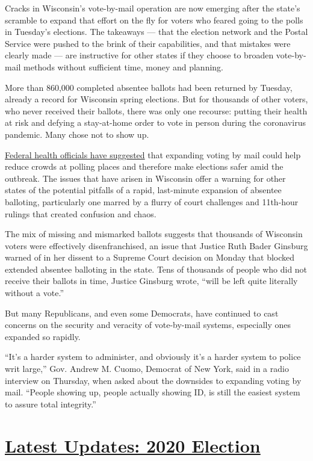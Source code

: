 Cracks in Wisconsin's vote-by-mail operation are now emerging after the
state's scramble to expand that effort on the fly for voters who feared
going to the polls in Tuesday's elections. The takeaways --- that the
election network and the Postal Service were pushed to the brink of
their capabilities, and that mistakes were clearly made --- are
instructive for other states if they choose to broaden vote-by-mail
methods without sufficient time, money and planning.

More than 860,000 completed absentee ballots had been returned by
Tuesday, already a record for Wisconsin spring elections. But for
thousands of other voters, who never received their ballots, there was
only one recourse: putting their health at risk and defying a
stay-at-home order to vote in person during the coronavirus pandemic.
Many chose not to show up.

\href{https://www.nytimes.com/2020/04/08/us/politics/republicans-vote-by-mail.html}{Federal
health officials have suggested} that expanding voting by mail could
help reduce crowds at polling places and therefore make elections safer
amid the outbreak. The issues that have arisen in Wisconsin offer a
warning for other states of the potential pitfalls of a rapid,
last-minute expansion of absentee balloting, particularly one marred by
a flurry of court challenges and 11th-hour rulings that created
confusion and chaos.

The mix of missing and mismarked ballots suggests that thousands of
Wisconsin voters were effectively disenfranchised, an issue that Justice
Ruth Bader Ginsburg warned of in her dissent to a Supreme Court decision
on Monday that blocked extended absentee balloting in the state. Tens of
thousands of people who did not receive their ballots in time, Justice
Ginsburg wrote, ``will be left quite literally without a vote.''

But many Republicans, and even some Democrats, have continued to cast
concerns on the security and veracity of vote-by-mail systems,
especially ones expanded so rapidly.

``It's a harder system to administer, and obviously it's a harder system
to police writ large,'' Gov. Andrew M. Cuomo, Democrat of New York, said
in a radio interview on Thursday, when asked about the downsides to
expanding voting by mail. ``People showing up, people actually showing
ID, is still the easiest system to assure total integrity.''

\hypertarget{latest-updates-2020-election}{%
\section{\texorpdfstring{\href{https://www.nytimes.com/2020/07/31/us/elections/biden-vs-trump.html?action=click\&pgtype=Article\&state=default\&region=MAIN_CONTENT_1\&context=storylines_live_updates}{Latest
Updates: 2020
Election}}{Latest Updates: 2020 Election}}\label{latest-updates-2020-election}}

